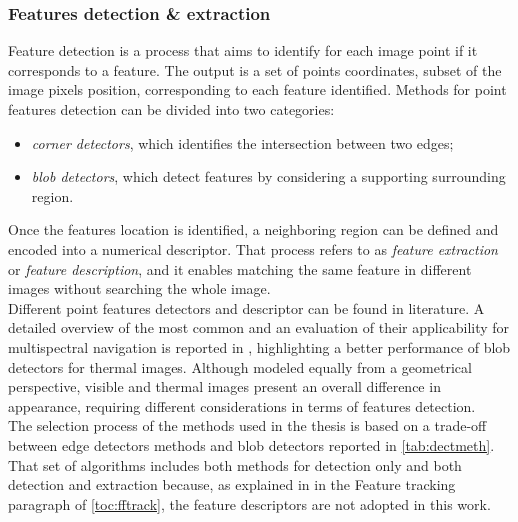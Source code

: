 \subsubsection*{Features detection \& extraction}
Feature detection is a process that aims to identify for each image point if it corresponds to a feature. The output is a set of points coordinates, subset of the image pixels position, corresponding to each feature identified. Methods for point features detection can be divided into two categories: 
\begin{itemize}
    \item \textit{corner detectors}, which identifies the intersection between two edges;
    \item  \textit{blob detectors}, which detect features by considering a supporting surrounding region.
\end{itemize}
Once the features location is identified, a neighboring region can be defined and encoded into a numerical descriptor. That process refers to as \textit{feature extraction} or \textit{feature description}, and it enables matching the same feature in different images without searching the whole image.\\
Different point features detectors and descriptor can be found in literature. A detailed overview of the most common and an evaluation of their applicability for multispectral navigation is reported in \cite{rondao2020benchmarking}, highlighting a better performance of blob detectors for thermal images. Although modeled equally from a geometrical perspective, visible and thermal images present an overall difference in appearance, requiring different considerations in terms of features detection. \\
The selection process of the methods used in the thesis is based on a trade-off between edge detectors methods and blob detectors reported in \cref{tab:dectmeth}. That set of algorithms includes both methods for detection only and both detection and extraction because, as explained in in the Feature tracking paragraph of \cref{toc:fftrack}, the feature descriptors are not adopted in this work.\\
